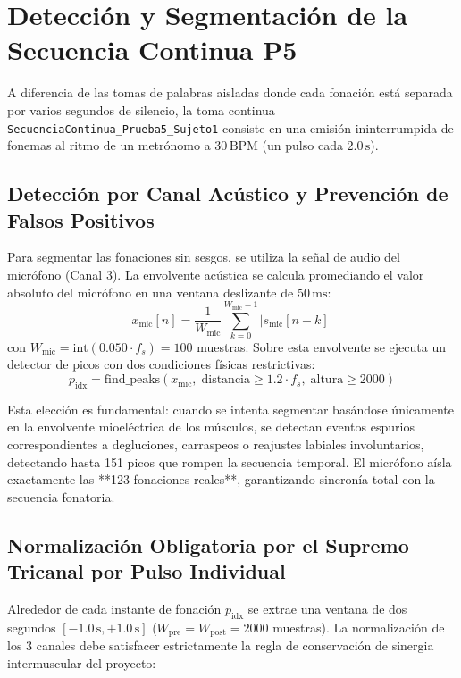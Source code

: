 \documentclass[11pt,a4paper]{article}
\begin{document}
\section{Detección y Segmentación de la Secuencia Continua P5}
\label{sec:secuencia_continua}

A diferencia de las tomas de palabras aisladas donde cada fonación está separada por varios segundos de silencio, la toma continua \texttt{SecuenciaContinua\_Prueba5\_Sujeto1} consiste en una emisión ininterrumpida de fonemas al ritmo de un metrónomo a $30\,\text{BPM}$ (un pulso cada $2.0\,\text{s}$).

\subsection{Detección por Canal Acústico y Prevención de Falsos Positivos}
\label{subsec:deteccion_acustica}

Para segmentar las fonaciones sin sesgos, se utiliza la señal de audio del micrófono (Canal 3). La envolvente acústica se calcula promediando el valor absoluto del micrófono en una ventana deslizante de $50\,\text{ms}$:
\begin{equation}
    x_{\text{mic}}[n] = \frac{1}{W_{\text{mic}}} \sum_{k=0}^{W_{\text{mic}}-1} |s_{\text{mic}}[n - k]|
\end{equation}
con $W_{\text{mic}} = \text{int}(0.050 \cdot f_s) = 100$ muestras. Sobre esta envolvente se ejecuta un detector de picos con dos condiciones físicas restrictivas:
\begin{equation}
    p_{\text{idx}} = \text{find\_peaks}(x_{\text{mic}}, \; \text{distancia} \ge 1.2 \cdot f_s, \; \text{altura} \ge 2000)
\end{equation}

Esta elección es fundamental: cuando se intenta segmentar basándose únicamente en la envolvente mioeléctrica de los músculos, se detectan eventos espurios correspondientes a degluciones, carraspeos o reajustes labiales involuntarios, detectando hasta 151 picos que rompen la secuencia temporal. El micrófono aísla exactamente las **123 fonaciones reales**, garantizando sincronía total con la secuencia fonatoria.

\subsection{Normalización Obligatoria por el Supremo Tricanal por Pulso Individual}
\label{subsec:supremo_tricanal}

Alrededor de cada instante de fonación $p_{\text{idx}}$ se extrae una ventana de dos segundos $[-1.0\,\text{s}, +1.0\,\text{s}]$ ($W_{\text{pre}} = W_{\text{post}} = 2000$ muestras). La normalización de los 3 canales debe satisfacer estrictamente la regla de conservación de sinergia intermuscular del proyecto:
\end{document}
